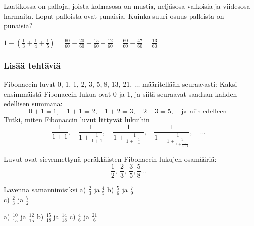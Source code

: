 \begin{tehtavasivu}
    \begin{tehtava} %
        Laatikossa on palloja, joista kolmasosa on mustia, neljäsosa
        valkoisia ja viidesosa harmaita. Loput palloista ovat punaisia.
        Kuinka suuri osuus palloista on punaisia?
        
        \begin{vastaus}
            $1-(\frac{1}{3}+\frac{1}{4}+\frac{1}{5})
            = \frac{60}{60}-\frac{20}{60}-\frac{15}{60}-\frac{12}{60}
            = \frac{60}{60}-\frac{47}{60}
            = \frac{13}{60}$
        \end{vastaus}
    \end{tehtava}


\subsubsection*{Lisää tehtäviä}

\begin{tehtava}
Fibonaccin luvut 0, 1, 1, 2, 3, 5, 8, 13, 21, $\ldots$ määritellään seuraavasti: Kaksi ensimmäistä
Fibonaccin lukua ovat 0 ja 1, ja siitä seuraavat saadaan kahden
edellisen summana: 
\[ 0+1=1, \quad 1+1=2, \quad 1+2 = 3, \quad 2+3=5, \quad 
\textrm{ja niin edelleen.} \]
Tutki, miten Fibonaccin luvut liittyvät lukuihin
\[ \frac{1}{1+1}, \quad \frac{1}{1+\frac{1}{1+1}}, \quad
\frac{1}{1+\frac{1}{1+\frac{1}{1+1}}}, \quad 
\frac{1}{1+\frac{1}{1+\frac{1}{1+\frac{1}{1+1}}}}, \quad \ldots\]
\begin{vastaus}
Luvut ovat sievennettynä peräkkäisten Fibonaccin
lukujen osamääriä:
\[\frac{1}{2}, \ \frac{2}{3}, \ \frac{3}{5}, \frac{5}{8} \ldots  \]
\end{vastaus}
\end{tehtava}

\begin{tehtava}
Lavenna samannimisiksi \quad
a) $\frac{2}{3}$ ja $\frac{4}{5}$ \quad b) $\frac{5}{6}$ ja $\frac{7}{9}$ \quad \\ c) $\frac{2}{3}$ ja $\frac{7}{2}$ 
\begin{vastaus}
a) $\frac{10}{15}$ ja $\frac{12}{15}$ \qquad b) $\frac{15}{18}$ ja $\frac{14}{18}$ \qquad c) $\frac{4}{6}$ ja $\frac{21}{6}$
\end{vastaus}
\end{tehtava}


 
    

\end{tehtavasivu}
